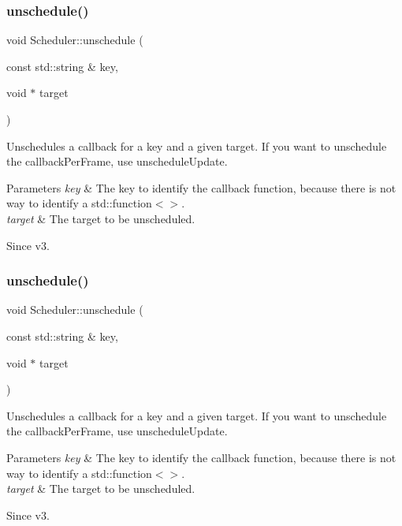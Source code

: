 \subsubsection{\texorpdfstring{unschedule()}{unschedule()}\hspace{0.1cm}{\footnotesize\ttfamily [1/4]}}
{\footnotesize\ttfamily void Scheduler\+::unschedule (\begin{DoxyParamCaption}\item[{const std\+::string \&}]{key,  }\item[{void $\ast$}]{target }\end{DoxyParamCaption})}

Unschedules a callback for a key and a given target. If you want to unschedule the \textquotesingle{}callback\+Per\+Frame\textquotesingle{}, use unschedule\+Update. 
\begin{DoxyParams}{Parameters}
{\em key} & The key to identify the callback function, because there is not way to identify a std\+::function$<$$>$. \\
\hline
{\em target} & The target to be unscheduled. \\
\hline
\end{DoxyParams}
\begin{DoxySince}{Since}
v3. 
\end{DoxySince}
\mbox{\label{classScheduler_a3ca194b9ca146d9c522cc2c54a6d4ede}} 
\subsubsection{\texorpdfstring{unschedule()}{unschedule()}\hspace{0.1cm}{\footnotesize\ttfamily [2/4]}}
{\footnotesize\ttfamily void Scheduler\+::unschedule (\begin{DoxyParamCaption}\item[{const std\+::string \&}]{key,  }\item[{void $\ast$}]{target }\end{DoxyParamCaption})}

Unschedules a callback for a key and a given target. If you want to unschedule the \textquotesingle{}callback\+Per\+Frame\textquotesingle{}, use unschedule\+Update. 
\begin{DoxyParams}{Parameters}
{\em key} & The key to identify the callback function, because there is not way to identify a std\+::function$<$$>$. \\
\hline
{\em target} & The target to be unscheduled. \\
\hline
\end{DoxyParams}
\begin{DoxySince}{Since}
v3. 
\end{DoxySince}
\mbox{\label{classScheduler_a6d354b587d5f12df2e6094116fd65c71}} 

